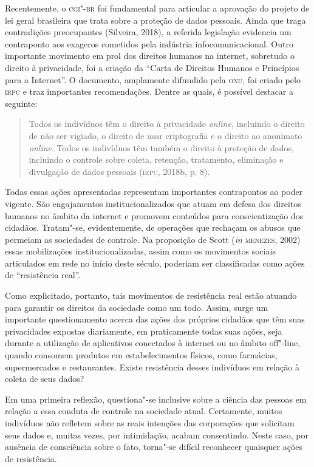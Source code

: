 Recentemente, o \textsc{cgi"-br} foi fundamental para articular a aprovação do
projeto de lei geral brasileira que trata sobre a proteção de dados
pessoais. Ainda que traga contradições preocupantes (Silveira, 2018), a
referida legislação evidencia um contraponto aos exageros cometidos pela
indústria infocomunicacional. Outro importante movimento em prol dos
direitos humanos na internet, sobretudo o direito à privacidade, foi a
criação da ``Carta de Direitos Humanos e Princípios para a Internet''. O
documento, amplamente difundido pela \textsc{onu}, foi criado pelo \textsc{irpc} e traz
importantes recomendações. Dentre as quais, é possível destacar a
seguinte:

\begin{quote}
Todos os indivíduos têm o direito à privacidade \emph{online}, incluindo o
direito de não ser vigiado, o direito de usar criptografia e o direito
ao anonimato \emph{online}. Todos os indivíduos têm também o direito à proteção
de dados, incluindo o controle sobre coleta, retenção, tratamento,
eliminação e divulgação de dados pessoais (\textsc{irpc}, 2018b, p. 8).
\end{quote}

Todas essas ações apresentadas representam importantes contrapontos ao
poder vigente. São engajamentos institucionalizados que atuam em defesa
dos direitos humanos no âmbito da internet e promovem conteúdos para
conscientização dos cidadãos. Tratam"-se, evidentemente, de operações que
rechaçam os abusos que permeiam as sociedades de controle. Na proposição
de Scott (\emph{in} \textsc{menezes}, 2002) essas mobilizações
institucionalizadas, assim como os movimentos sociais articulados em
rede no início deste século, poderiam ser classificadas como ações de
``resistência real''.

Como explicitado, portanto, tais movimentos de resistência real estão
atuando para garantir os direitos da sociedade como um todo. Assim,
surge um importante questionamento acerca das ações dos próprios
cidadãos que têm suas privacidades expostas diariamente, em praticamente
todas suas ações, seja durante a utilização de aplicativos conectados à
internet ou no âmbito off"-line, quando consomem produtos em
estabelecimentos físicos, como farmácias, supermercados e restaurantes.
Existe resistência desses indivíduos em relação à coleta de seus dados?

Em uma primeira reflexão, questiona"-se inclusive sobre a ciência das
pessoas em relação a essa conduta de controle na sociedade atual.
Certamente, muitos indivíduos não refletem sobre as reais intenções das
corporações que solicitam seus dados e, muitas vezes, por intimidação,
acabam consentindo. Neste caso, por ausência de consciência sobre o
fato, torna"-se difícil reconhecer quaisquer ações de resistência.

